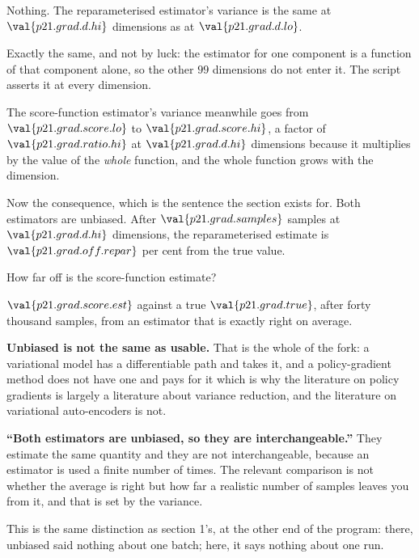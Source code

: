 \begin{fr}
\begin{ansblock}
Nothing. The reparameterised estimator's variance is the same at
$\val{p21.grad.d.hi}$ dimensions as at $\val{p21.grad.d.lo}$.
\end{ansblock}

Exactly the same, and not by luck: the estimator for one component is a
function of that component alone, so the other $99$ dimensions do not enter
it. The script asserts it at every dimension.

The score-function estimator's variance meanwhile goes from
$\val{p21.grad.score.lo}$ to $\val{p21.grad.score.hi}$, a factor of
$\val{p21.grad.ratio.hi}$ at $\val{p21.grad.d.hi}$ dimensions \dash{} because
it multiplies by the value of the \emph{whole} function, and the whole
function grows with the dimension.
\end{fr}

\begin{fr}
Now the consequence, which is the sentence the section exists for. Both
estimators are unbiased. After $\val{p21.grad.samples}$ samples at
$\val{p21.grad.d.hi}$ dimensions, the reparameterised estimate is
$\val{p21.grad.off.repar}$ per cent from the true value.

How far off is the score-function estimate?
\nextframe
\end{fr}

\begin{fr}
$\val{p21.grad.score.est}$ against a true $\val{p21.grad.true}$, after forty
thousand samples, from an estimator that is exactly right on average.

\textbf{Unbiased is not the same as usable.} That is the whole of the fork:
a variational model has a differentiable path and takes it, and a
policy-gradient method does not have one and pays for it \dash{} which is why
the literature on policy gradients is largely a literature about variance
reduction, and the literature on variational auto-encoders is not.
\end{fr}

\begin{fr}
\begin{trapbox}
\textbf{\enquote{Both estimators are unbiased, so they are interchangeable.}}
They estimate the same quantity and they are not interchangeable, because an
estimator is used a finite number of times. The relevant comparison is not
whether the average is right but how far a realistic number of samples leaves
you from it, and that is set by the variance.

This is the same distinction as section 1's, at the other end of the program:
there, unbiased said nothing about one batch; here, it says nothing about one
run.
\end{trapbox}
\end{fr}

